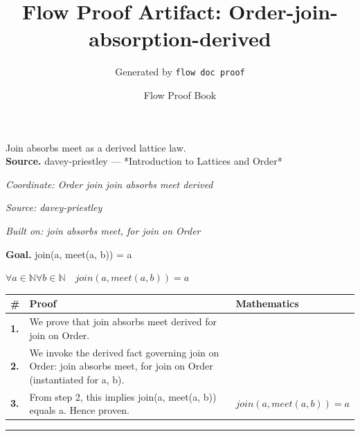 \documentclass[11pt]{article}
\title{Flow Proof Artifact: Order-join-absorption-derived}
\author{Generated by \texttt{flow doc proof}}
\date{Flow Proof Book}
\theoremstyle{definition}
\begin{document}
\maketitle
Join absorbs meet as a derived lattice law.\\[0.5em]
\textbf{Source.} davey-priestley — *Introduction to Lattices and Order*\\[0.5em]
\bigskip
{}\par
\smallskip\noindent\textit{Coordinate: Order \cdot join \cdot join absorbs meet derived}\par
\smallskip\noindent\textit{Source: davey-priestley}\par
\smallskip\noindent\textit{Built on: join absorbs meet, for join on Order}\par
\medskip
\noindent\textbf{Goal.} join(a, meet(a, b)) = a\par
\noindent$\displaystyle \forall a \in \mathbb{N} \forall b \in \mathbb{N}\quad join(a, meet(a, b)) = a$\par
\medskip
\noindent
\begin{tabular}{@{} >{\raggedright\arraybackslash}p{} >{\raggedright\arraybackslash}p{} >{\raggedleft\arraybackslash}p{} @{}}
\textbf{\#} & \textbf{Proof} & \textbf{Mathematics} \\
\midrule
\textbf{1.} & We prove that join absorbs meet derived for join on Order. & \\[0.45em]
\textbf{2.} & We invoke the derived fact governing join on Order: join absorbs meet, for join on Order (instantiated for a, b). & \\[0.45em]
\textbf{3.} & From step 2, this implies join(a, meet(a, b)) equals a. Hence proven. & $\displaystyle join(a, meet(a, b)) = a$ \\[0.45em]
\bottomrule
\end{tabular}
\label{thm:Order-join-join_absorbs_meet_derived}
\par\medskip\hrule
\end{document}
